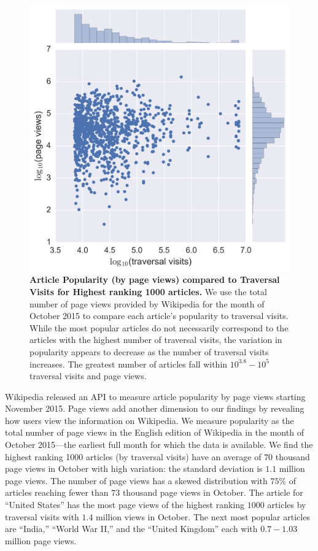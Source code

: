 \documentclass[11pt]{report}
\begin{document}
\begin{figure}[tp!]
  \includegraphics[width=\columnwidth]{graphics/views_visits.png}
  \caption{
\textbf{Article Popularity (by page views) compared to Traversal Visits 
for Highest ranking 1000 articles.}
We use the total number of page views provided by Wikipedia for the month
of October 2015 to compare each article's popularity to traversal visits.
While the most popular articles do not necessarily correspond to the articles
with the highest number of traversal visits, the variation in popularity appears to decrease as the number of traversal visits increases. The greatest number of articles fall within $10^{3.8}-10^5$ traversal visits and page views.}
  \label{fig:Views and Visits}

\end{figure}
Wikipedia released an API to measure article popularity by page views
starting November 2015. Page views add another dimension to our
findings by revealing 
how users view the information on Wikipedia. 
We measure popularity as the total number 
of page views in the English edition of Wikipedia in the month of 
October 2015---the earliest full month for which the data is available. 
We find the highest ranking 1000 articles (by traversal visits) have an average of
$70$ thousand page views in October with high variation: the standard deviation 
is $1.1$ million page views. 
The number of page views has a skewed distribution with $75\%$ of articles
reaching fewer than $73$ thousand page views in October.
The article for ``United States'' has the most page 
views of the highest ranking $1000$ articles by traversal visits with 
$1.4$ million views in October. The next most popular articles are 
``India,'' ``World War II,'' and the ``United Kingdom'' each with $0.7-1.03$ million page views. 
\end{document}
